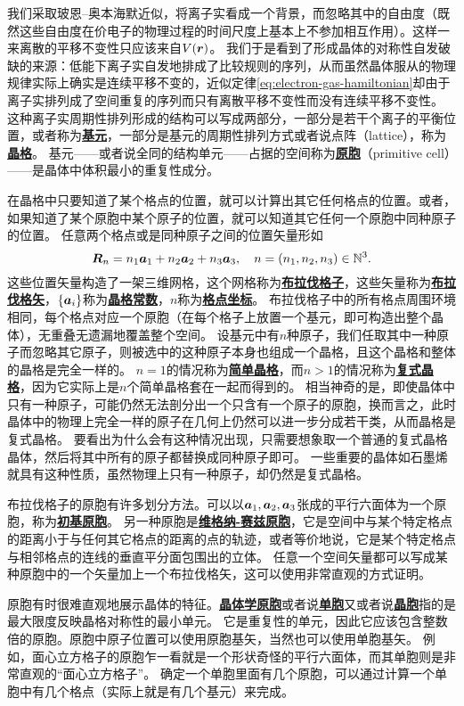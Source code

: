 \documentclass[hyperref, UTF8, a4paper]{ctexart}
\newcommand*{\concept}[1]{\underline{\textbf{#1}}}
\begin{document}
我们采取玻恩–奥本海默近似，将离子实看成一个背景，而忽略其中的自由度（既然这些自由度在价电子的物理过程的时间尺度上基本上不参加相互作用）。这样一来离散的平移不变性只应该来自$V(\vb*{r})$。
我们于是看到了形成晶体的对称性自发破缺的来源：低能下离子实自发地排成了比较规则的序列，从而虽然晶体服从的物理规律实际上确实是连续平移不变的，近似定律\eqref{eq:electron-gas-hamiltonian}却由于离子实排列成了空间重复的序列而只有离散平移不变性而没有连续平移不变性。
这种离子实周期性排列形成的结构可以写成两部分，一部分是若干个离子的平衡位置，或者称为\concept{基元}，一部分是基元的周期性排列方式或者说点阵（lattice），称为\concept{晶格}。
基元——或者说全同的结构单元——占据的空间称为\concept{原胞}（primitive cell）——是晶体中体积最小的重复性成分。

在晶格中只要知道了某个格点的位置，就可以计算出其它任何格点的位置。或者，如果知道了某个原胞中某个原子的位置，就可以知道其它任何一个原胞中同种原子的位置。
任意两个格点或是同种原子之间的位置矢量形如
\begin{equation}
    \vb*{R}_n = n_1 \vb*{a}_1 + n_2 \vb*{a}_2 + n_3 \vb*{a}_3, \quad n = (n_1, n_2, n_3) \in \mathbb{N}^3.
\end{equation}
这些位置矢量构造了一架三维网格，这个网格称为\concept{布拉伐格子}，这些矢量称为\concept{布拉伐格矢}，$\{\vb*{a}_i\}$称为\concept{晶格常数}，$n$称为\concept{格点坐标}。
布拉伐格子中的所有格点周围环境相同，每个格点对应一个原胞（在每个格子上放置一个基元，即可构造出整个晶体），无重叠无遗漏地覆盖整个空间。
设基元中有$n$种原子，我们任取其中一种原子而忽略其它原子，则被选中的这种原子本身也组成一个晶格，且这个晶格和整体的晶格是完全一样的。
$n=1$的情况称为\concept{简单晶格}，而$n>1$的情况称为\concept{复式晶格}，因为它实际上是$n$个简单晶格套在一起而得到的。
相当神奇的是，即使晶体中只有一种原子，可能仍然无法剖分出一个只含有一个原子的原胞，换而言之，此时晶体中的物理上完全一样的原子在几何上仍然可以进一步分成若干类，从而晶格是复式晶格。
要看出为什么会有这种情况出现，只需要想象取一个普通的复式晶格晶体，然后将其中所有的原子都替换成同种原子即可。
一些重要的晶体如石墨烯就具有这种性质，虽然物理上只有一种原子，却仍然是复式晶格。

布拉伐格子的原胞有许多划分方法。可以以$\vb*{a}_1, \vb*{a}_2, \vb*{a}_3$张成的平行六面体为一个原胞，称为\concept{初基原胞}。
另一种原胞是\concept{维格纳-赛兹原胞}，它是空间中与某个特定格点的距离小于与任何其它格点的距离的点的轨迹，或者等价地说，它是某个特定格点与相邻格点的连线的垂直平分面包围出的立体。
任意一个空间矢量都可以写成某种原胞中的一个矢量加上一个布拉伐格矢，这可以使用非常直观的方式证明。

原胞有时很难直观地展示晶体的特征。\concept{晶体学原胞}或者说\concept{单胞}又或者说\concept{晶胞}指的是最大限度反映晶格对称性的最小单元。
它是重复性的单元，因此它应该包含整数倍的原胞。原胞中原子位置可以使用原胞基矢，当然也可以使用单胞基矢。
例如，面心立方格子的原胞乍一看就是一个形状奇怪的平行六面体，而其单胞则是非常直观的“面心立方格子”。
确定一个单胞里面有几个原胞，可以通过计算一个单胞中有几个格点（实际上就是有几个基元）来完成。
\end{document}
